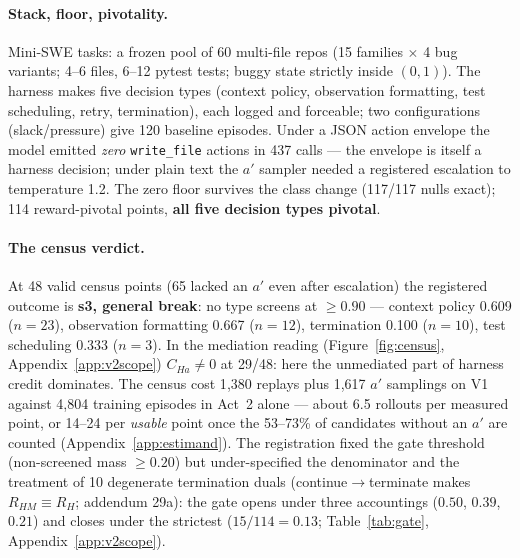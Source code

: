 \documentclass{article}
\theoremstyle{remark}
\begin{document}
\paragraph{Stack, floor, pivotality.} Mini-SWE tasks: a frozen pool of
60 multi-file repos (15 families $\times$ 4 bug variants; 4--6 files,
6--12 pytest tests; buggy state strictly inside $(0,1)$). The harness
makes five decision types (context policy, observation formatting, test
scheduling, retry, termination), each logged and forceable; two
configurations (slack/pressure) give 120 baseline episodes. Under a JSON
action envelope the model emitted \emph{zero} \texttt{write\_file}
actions in 437 calls --- the envelope is itself a harness decision;
under plain text the $a'$ sampler needed a registered escalation to
temperature 1.2. The zero floor survives the class change (117/117 nulls
exact); 114 reward-pivotal points, \textbf{all five decision types
pivotal}.

\paragraph{The census verdict.} At 48 valid census points (65 lacked an
$a'$ even after escalation) the registered outcome is \textbf{s3, general
break}: no type screens at $\geq 0.90$ --- context policy 0.609 ($n=23$),
observation formatting 0.667 ($n=12$), termination 0.100 ($n=10$), test
scheduling 0.333 ($n=3$). In the mediation reading
(Figure~\ref{fig:census}, Appendix~\ref{app:v2scope}) $C_{Ha} \neq 0$
at 29/48: here the unmediated part of harness credit dominates. The
census cost 1{,}380 replays plus 1{,}617 $a'$ samplings on V1 against
4{,}804 training episodes in Act~2 alone --- about 6.5 rollouts per
measured point, or 14--24 per \emph{usable} point once the 53--73\%
of candidates without an $a'$ are counted (Appendix~\ref{app:estimand}).
The registration fixed the gate threshold (non-screened mass
$\geq 0.20$) but under-specified the denominator and the treatment of 10
degenerate termination duals (continue$\to$terminate makes $R_{HM}
\equiv R_H$; addendum 29a): the gate opens under three accountings
($0.50$, $0.39$, $0.21$) and closes under the strictest ($15/114 =
0.13$; Table~\ref{tab:gate}, Appendix~\ref{app:v2scope}).
\end{document}
